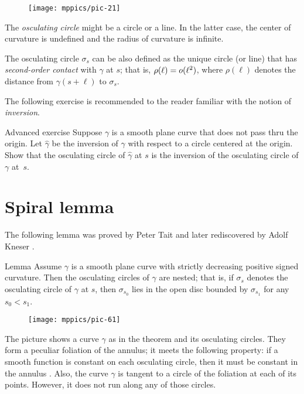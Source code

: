 {

\begin{wrapfigure}{o}{31 mm}
\vskip-0mm
\centering
\texttt{[image: mppics/pic-21]}
\vskip0mm
\end{wrapfigure}

The \textit{osculating circle} might be a circle or a line.
In the latter case, the center of curvature is undefined and the radius of curvature is infinite. 


The osculating circle $\sigma_s$ can be also defined as the unique circle (or line) that has \emph{second-order contact} with $\gamma$ at $s$;
that is, $\rho(\ell)\z=o(\ell^2)$, where $\rho(\ell)$ denotes the distance from $\gamma(s+\ell)$ to $\sigma_s$.

The following exercise is recommended to the reader familiar with the notion of \emph{inversion}.

}

\begin{thm}{Advanced exercise}\label{ex:inverse}
Suppose $\gamma$ is a smooth plane curve that does not pass thru the origin.
Let $\hat \gamma$ be the inversion of $\gamma$ with respect to a circle centered at the origin.
Show that the osculating circle of $\hat\gamma$ at $s$ is the inversion of the osculating circle of $\gamma$ at~$s$.
\end{thm}

\section{Spiral lemma}
\label{spiral}

The following lemma was proved by Peter Tait \cite{tait}
and later rediscovered by Adolf Kneser \cite{kneser}.

\begin{thm}{Lemma}\label{lem:spiral}
Assume $\gamma$ is a smooth plane curve with strictly decreasing positive signed curvature. Then the osculating circles of $\gamma$ are nested; that is, if $\sigma_s$ denotes the osculating circle of $\gamma$ at $s$,
then $\sigma_{s_0}$ lies in the open disc bounded by $\sigma_{s_1}$ for any $s_0<s_1$. 
\end{thm}

{

\begin{wrapfigure}{r}{31 mm}
\vskip-6mm
\texttt{[image: mppics/pic-61]}
\end{wrapfigure}


The picture shows a curve $\gamma$ as in the theorem and its osculating circles.
They form a peculiar foliation of the annulus; it meets the following property:
if a smooth function is constant on each osculating circle, then it must be constant in the annulus \cite[Lecture 10]{fuchs-tabachnikov}.
Also, the curve $\gamma$ is tangent to a circle of the foliation at each of its points.
However, it does not run along any of those circles.

}

